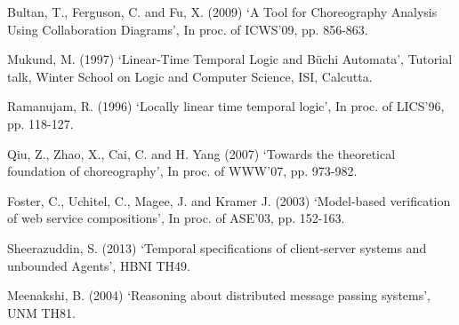 \documentclass[a4paper, 14pt, oneside]{Thesis}
\begin{document}
\begin{spacing}{1.5}

\end{spacing}
\newpage
\appendix


% 
%
%
\begin{thebibliography}{99}
  
  
 Bultan, T., Ferguson, C. and Fu, X. (2009) `A Tool for Choreography Analysis Using Collaboration Diagrams',
   In proc. of ICWS'09, pp. 856-863.

 Mukund, M. (1997) `Linear-Time Temporal Logic and Büchi Automata', Tutorial talk, Winter School on Logic and Computer Science, ISI, Calcutta.

 Ramanujam, R. (1996) `Locally linear time temporal logic', In proc. of LICS'96, pp. 118-127.

 Qiu, Z., Zhao, X., Cai, C. and H. Yang (2007) `Towards the theoretical foundation of choreography', In proc. of WWW'07, pp. 973-982.

 Foster, C.,  Uchitel, C., Magee, J. and Kramer J. (2003) `Model-based verification of web service compositions', In proc. of ASE'03, pp. 152-163.

 Sheerazuddin, S.  (2013) `Temporal specifications of client-server systems and unbounded Agents', HBNI TH49.

 Meenakshi, B. (2004) `Reasoning about distributed message passing systems', UNM TH81.
\end{thebibliography}

\end{document}
